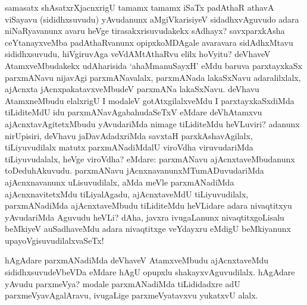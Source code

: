 
\begin{artha}
samasatx shAsatxrXjacnxrigU tamamx tamamx iSaTx padAthaR athavA viSayavu (sididhxsuvudu) yAvudanunx aMgiVkarisiyeV sidadhxvAguvudo adara niNaRyavanunx avaru heVge tirasakxrisuvudakekx sAdhayx? savxparxkAsha ceYtanayxveMba padAthaRvanunx opipxkoMDAgale avaravara sidAdhxMtavu sididhxsuvudu, hiVgiruvAga veVdAMtAthaRvu elilx hoVyitu? deVhaveV AtamxveMbudakekx udAharisida `ahaMmanuSayxH' eMdu baruva parxtayxkaSx parxmANavu nijavAgi parxmANavalalx, parxmANada lakaSxNavu adaralilxlalx, ajAcnxta jAcnxpakatavxveMbudeV parxmANa lakaSxNavu. deVhavu AtamxneMbudu elalxrigU I modaleV gotAtxgilalxveMdu I parxtayxkaSxdiMda tiLiditeMdU idu parxmANavAgabahudaSeTxV eMdare deVhAtamxvu ajAcnxtavAgitetxMbudu yAvudariMda nimage tiLiditeMdu heVLuviri? adanunx nirUpisiri, deVhavu jaDavAdadxriMda savxtaH parxkAshavAgilalx, tiLiyuvudilalx matutx parxmANadiMdalU viroVdha viruvudariMda tiLiyuvudalalx, heVge viroVdha? eMdare: parxmANavu ajAcnxtaveMbudanunx toDeduhAkuvudu. parxmANavu jAcnxnavanunxMTumADuvudariMda ajAcnxnavanunx uLisuvudilalx, aMda meVle parxmANadiMda ajAcnxnavitetxMdu tiLiyalAgadu, ajAcnxtaveMdU tiLiyuvudilalx, parxmANadiMda ajAcnxtaveMbudu tiLiditeMdu heVLidare adara nivaqtitxyu yAvudariMda Aguvudu heVLi? dAha, javxra ivugaLanunx nivaqtitxgoLisalu beMkiyeV auSadhaveMdu adara nivaqtitxge veYdayxru eMdigU beMkiyanunx upayoVgisuvudilalxvaSeTx!
\end{artha}

\begin{artha}
hAgAdare parxmANadiMda deVhaveV AtamxveMbudu ajAcnxtaveMdu sididhxsuvudeVbeVDa eMdare hAgU opupxlu shakayxvAguvudilalx. hAgAdare yAvudu parxmeVya? modale parxmANadiMda tiLididadxre adU parxmeVyavAgalAravu, ivugaLige parxmeVyatavxvu yukatxvU alalx.
\end{artha}


